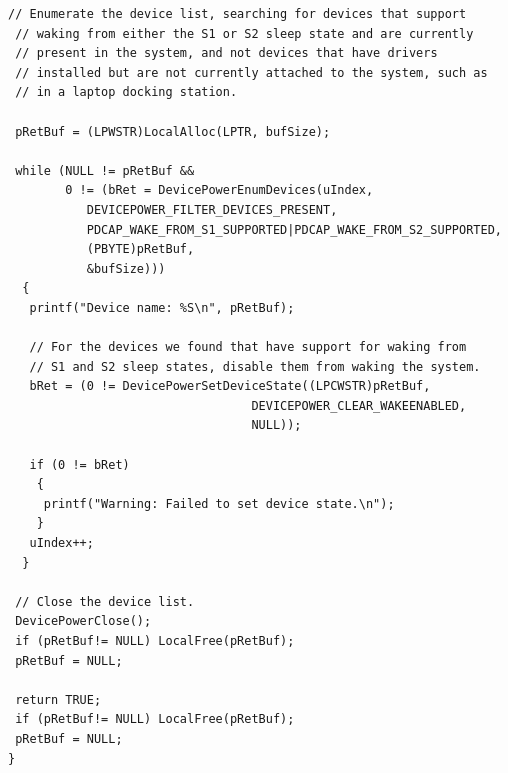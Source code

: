 \documentclass[fontsize=11pt, %
                             paper=letter, %
                             twoside, %
                             captions=tableheading,
                             index=totoc,
                             hyperref]{labbook}
\begin{document}
\begin{addmargin}[0cm]{0cm}
\begin{Verbatim}[tabsize=4]
 // Enumerate the device list, searching for devices that support 
 // waking from either the S1 or S2 sleep state and are currently 
 // present in the system, and not devices that have drivers 
 // installed but are not currently attached to the system, such as 
 // in a laptop docking station.

 pRetBuf = (LPWSTR)LocalAlloc(LPTR, bufSize);

 while (NULL != pRetBuf && 
        0 != (bRet = DevicePowerEnumDevices(uIndex,
           DEVICEPOWER_FILTER_DEVICES_PRESENT,
           PDCAP_WAKE_FROM_S1_SUPPORTED|PDCAP_WAKE_FROM_S2_SUPPORTED,
           (PBYTE)pRetBuf,
           &bufSize)))
  {
   printf("Device name: %S\n", pRetBuf);

   // For the devices we found that have support for waking from 
   // S1 and S2 sleep states, disable them from waking the system.
   bRet = (0 != DevicePowerSetDeviceState((LPCWSTR)pRetBuf, 
                                  DEVICEPOWER_CLEAR_WAKEENABLED, 
                                  NULL));

   if (0 != bRet) 
    {
     printf("Warning: Failed to set device state.\n");
    }
   uIndex++;
  }

 // Close the device list.
 DevicePowerClose();
 if (pRetBuf!= NULL) LocalFree(pRetBuf);
 pRetBuf = NULL;

 return TRUE;
 if (pRetBuf!= NULL) LocalFree(pRetBuf);
 pRetBuf = NULL;
}
\end{Verbatim}


\end{addmargin}
\end{document}
